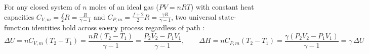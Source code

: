 For any closed system of $n$ moles of an ideal gas ($PV = nRT$) with constant heat capacities $C_{V,m} = \frac{f}{2}R = \frac{R}{\gamma - 1}$ and $C_{P,m} = \frac{f+2}{2}R = \frac{\gamma R}{\gamma - 1}$, two universal state-function identities hold across \textbf{every} process regardless of path :
\begin{equation}\label{eq:07:universal-u-h}
  \boxed{\Delta U = nC_{V,m}(T_2 - T_1) = \frac{nR(T_2 - T_1)}{\gamma - 1} = \frac{P_2V_2 - P_1V_1}{\gamma - 1}}, \qquad \boxed{\Delta H = nC_{P,m}(T_2 - T_1) = \frac{\gamma(P_2V_2 - P_1V_1)}{\gamma - 1} = \gamma\,\Delta U}
\end{equation}

